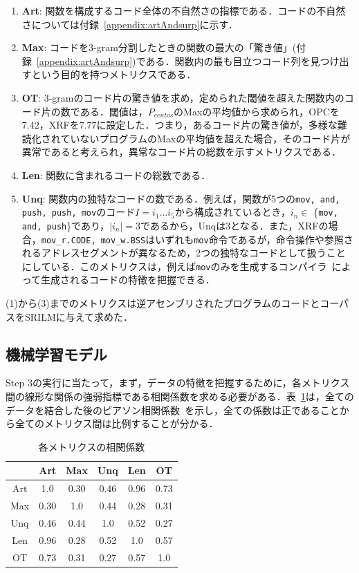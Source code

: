 \documentclass[12pt]{jarticle}
\newcommand\doubleRule{\toprule\toprule}
\begin{document}
\begin{enumerate}
  \item \textbf{Art}: 関数を構成するコード全体の不自然さの指標である．コードの不自然さについては付録~\ref{appendix:artAndsurp}に示す．
  \item \textbf{Max}: コードを3-gram分割したときの関数の最大の「驚き値」(付録~\ref{appendix:artAndsurp})である．関数内の最も目立つコード列を見つけ出すという目的を持つメトリクスである．
  \item \textbf{OT}: 3-gramのコード片の驚き値を求め，定められた閾値を超えた関数内のコード片の数である．閾値は，$P_{centos}$のMaxの平均値から求められ，OPCを7.42，XRFを7.77に設定した．つまり，あるコード片の驚き値が，多様な難読化されていないプログラムのMaxの平均値を超えた場合，そのコード片が異常であると考えられ，異常なコード片の総数を示すメトリクスである．
  \item \textbf{Len}: 関数に含まれるコードの総数である．
  \item \textbf{Unq}: 関数内の独特なコードの数である．例えば，関数が5つの\texttt{mov, and, push, push, mov}のコード$I=i_1...i_5$から構成されているとき，$i_n\in$ \{\texttt{mov, and, push}\}であり，$|i_n|=3$であるから，Unqは3となる．また，XRFの場合，\texttt{mov\_r.CODE, mov\_w.BSS}はいずれも\texttt{mov}命令であるが，命令操作や参照されるアドレスセグメントが異なるため，2つの独特なコードとして扱うことにしている．このメトリクスは，例えば\texttt{mov}のみを生成するコンパイラ~\cite{movfuscator}によって生成されるコードの特徴を把握できる．
\end{enumerate}
(1)から(3)までのメトリクスは逆アセンブリされたプログラムのコードとコーパスをSRILMに与えて求めた．

\subsection{機械学習モデル}
Step 3の実行に当たって，まず，データの特徴を把握するために，各メトリクス間の線形な関係の強弱指標である相関係数を求める必要がある．表~\ref{table:correl}は，全てのデータを結合した後のピアソン相関係数~\cite{pearson}を示し，全ての係数は正であることから全てのメトリクス間は比例することが分かる．

\begin{table}[th]
\centering
\caption{各メトリクスの相関係数}
\label{table:correl}
\begin{tabular}[t]{c|ccccc}
\doubleRule
& Art & Max & Unq & Len & OT \\
\hline
Art & 1.0  & 0.30 & 0.46 & 0.96 & 0.73 \\
Max & 0.30 & 1.0  & 0.44 & 0.28 & 0.31 \\
Unq & 0.46 & 0.44 & 1.0  & 0.52 & 0.27 \\
Len & 0.96 & 0.28 & 0.52 & 1.0  & 0.57 \\
OT  & 0.73 & 0.31 & 0.27 & 0.57 & 1.0  \\
\bottomrule
\end{tabular}
\end{table}
\end{document}
